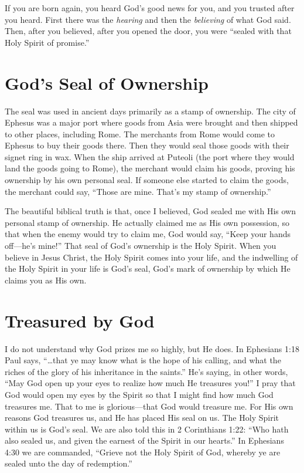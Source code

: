 If you are born again, you heard God’s good news for 
you, and you trusted after you heard. First there was the 
\emph{hearing} and then the \emph{believing} of what God said. Then, after 
you believed, after you opened the door, you were “sealed 
with that Holy Spirit of promise.”


\section*{God's Seal of Ownership}

The seal was used in ancient days primarily as a stamp 
of ownership. The city of Ephesus was a major port where 
goods from Asia were brought and then shipped to other 
places, including Rome. The merchants from Rome would 
come to Ephesus to buy their goods there. Then they would 
seal those goods with their signet ring in wax. When the 
ship arrived at Puteoli (the port where they would land the 
goods going to Rome), the merchant would claim his goods, 
proving his ownership by his own personal seal. If someone else started to claim the goods, the merchant could say, 
“Those are mine. That’s my stamp of ownership.”

The beautiful biblical truth is that, once I believed, God 
sealed me with His own personal stamp of ownership. He 
actually claimed me as His own possession, so that when 
the enemy would try to claim me, God would say, “Keep 
your hands off—he’s mine!” That seal of God’s ownership 
is the Holy Spirit. When you believe in Jesus Christ, the 
Holy Spirit comes into your life, and the indwelling of the 
Holy Spirit in your life is God’s seal, God’s mark of ownership by which He claims you as His own.


\section*{Treasured by God}

I do not understand why God prizes me so highly, but 
He does. In Ephesians 1:18 Paul says, “…that ye may know 
what is the hope of his calling, and what the riches of the 
glory of his inheritance in the saints.” He’s saying, in other 
words, “May God open up your eyes to realize how much 
He treasures you!” I pray that God would open my eyes by 
the Spirit so that I might find how much God treasures me. 
That to me is glorious—that God would treasure me. For 
His own reasons God treasures us, and He has placed His 
seal on us. The Holy Spirit within us is God’s seal. We 
are also told this in 2 Corinthians 1:22: “Who hath also 
sealed us, and given the earnest of the Spirit in our hearts.” 
In Ephesians 4:30 we are commanded, “Grieve not the 
Holy Spirit of God, whereby ye are sealed unto the day of 
redemption.”


